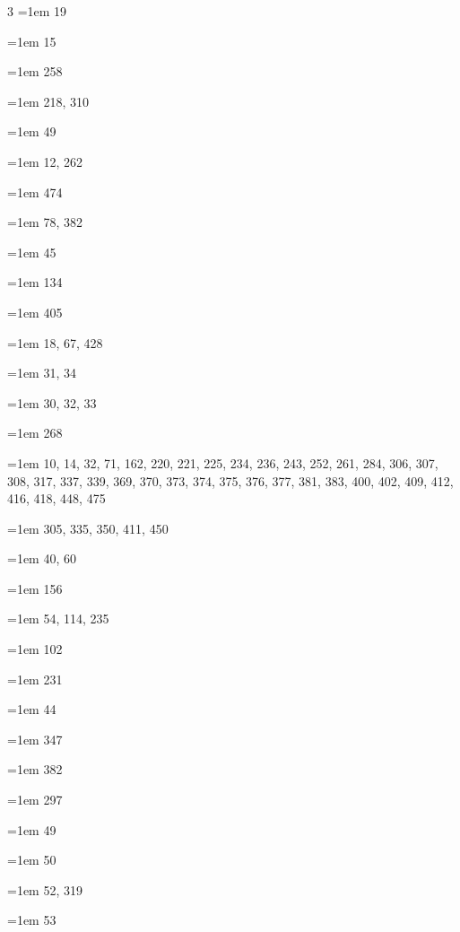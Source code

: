 \begin{multicols}{3}
\hangindent=1em  19\par
\hangindent=1em  15\par
\hangindent=1em  258\par
\hangindent=1em  218, 310\par
\hangindent=1em  49\par
\hangindent=1em  12, 262\par
\hangindent=1em  474\par
\hangindent=1em  78, 382\par
\hangindent=1em  45\par
\hangindent=1em  134\par
\hangindent=1em  405\par
\hangindent=1em  18, 67, 428\par
\hangindent=1em  31, 34\par
\hangindent=1em  30, 32, 33\par
\hangindent=1em  268\par
\hangindent=1em  10, 14, 32, 71, 162, 220, 221, 225, 234, 236, 243, 252, 261, 284, 306, 307, 308, 317, 337, 339, 369, 370, 373, 374, 375, 376, 377, 381, 383, 400, 402, 409, 412, 416, 418, 448, 475\par
\hangindent=1em  305, 335, 350, 411, 450\par
\hangindent=1em  40, 60\par
\hangindent=1em  156\par
\hangindent=1em  54, 114, 235\par
\hangindent=1em  102\par
\hangindent=1em  231\par
\hangindent=1em  44\par
\hangindent=1em  347\par
\hangindent=1em  382\par
\hangindent=1em  297\par
\hangindent=1em  49\par
\hangindent=1em  50\par
\hangindent=1em  52, 319\par
\hangindent=1em  53\par

\end{multicols}
